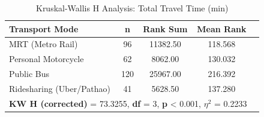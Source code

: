 \begin{table}[htbp]
\centering
\caption{Kruskal-Wallis H Analysis: Total Travel Time (min)}
\label{tab:analysis_04_total_travel_time}
\begin{tabular}{lcccc}
\hline
\textbf{Transport Mode} & \textbf{n} & \textbf{Rank Sum} & \textbf{Mean Rank} \\
\hline
MRT (Metro Rail) & 96 & 11382.50 & 118.568 \\
Personal Motorcycle & 62 & 8062.00 & 130.032 \\
Public Bus & 120 & 25967.00 & 216.392 \\
Ridesharing (Uber/Pathao) & 41 & 5628.50 & 137.280 \\
\hline
\multicolumn{4}{l}{\textbf{KW H (corrected)} = 73.3255, \textbf{df} = 3, \textbf{p} < 0.001, \textbf{$\eta^2$} = 0.2233} \\
\hline
\end{tabular}
\end{table}
